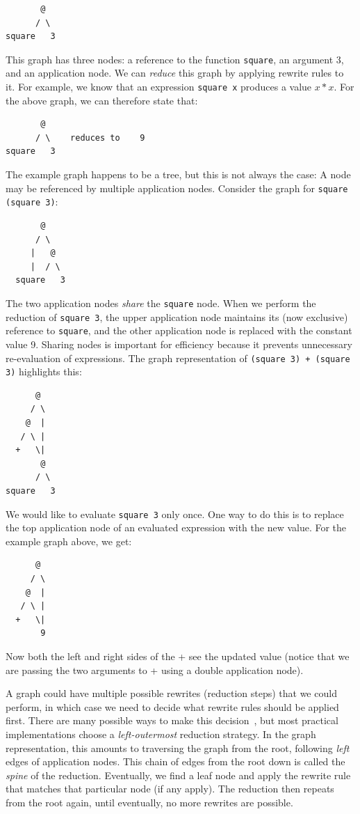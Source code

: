 \documentclass[conference]{IEEEtran}
\begin{document}
\begin{verbatim}
       @
      / \
square   3
\end{verbatim}

This graph has three nodes: a reference to the function \texttt{square}, an argument 3, and an application node.
We can \emph{reduce} this graph by applying rewrite rules to it. For example, we know that an expression \texttt{square x} produces a value $x*x$.
For the above graph, we can therefore state that:

\begin{verbatim}
       @
      / \    reduces to    9
square   3
\end{verbatim}

The example graph happens to be a tree, but this is not always the case: A node may be referenced by multiple application nodes.
Consider the graph for \texttt{square (square 3)}:

\begin{verbatim}
       @
      / \
     |   @
     |  / \
  square   3
\end{verbatim}

The two application nodes \emph{share} the \texttt{square} node.
When we perform the reduction of \texttt{square 3}, the upper application node maintains its (now exclusive) reference to \texttt{square}, and the other application node is replaced with the constant value 9.
Sharing nodes is important for efficiency because it prevents unnecessary re-evaluation of expressions.
The graph representation of \texttt{(square 3) + (square 3)} highlights this:

\begin{verbatim}
      @ 
     / \
    @  |
   / \ |
  +   \|
       @
      / \
square   3
\end{verbatim}

We would like to evaluate \texttt{square 3} only once.
One way to do this is to replace the top application node of an evaluated expression with the new value.
For the example graph above, we get:

\begin{verbatim}
      @ 
     / \
    @  |
   / \ |
  +   \|
       9
\end{verbatim}

Now both the left and right sides of the + see the updated value (notice that we are passing the two arguments to + using a double application node).

A graph could have multiple possible rewrites (reduction steps) that we could perform, in which case we need to decide what rewrite rules should be applied first.
There are many possible ways to make this decision~\cite{spj_impl}, but most practical implementations choose a \emph{left-outermost} reduction strategy.
In the graph representation, this amounts to traversing the graph from the root, following \emph{left} edges of application nodes.
This chain of edges from the root down is called the \emph{spine} of the reduction.
Eventually, we find a leaf node and apply the rewrite rule that matches that particular node (if any apply).
The reduction then repeats from the root again, until eventually, no more rewrites are possible.
\end{document}
